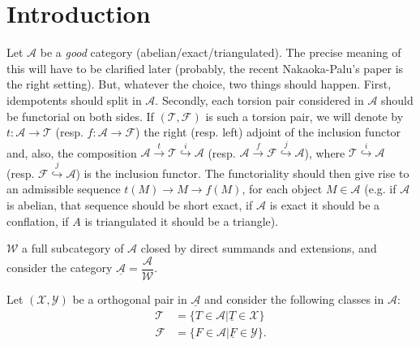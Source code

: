 \section{Introduction}

Let $\mathcal{A}$ be a \emph{good} category
(abelian/exact/triangulated). The precise meaning of this will have to
be clarified later (probably, the recent Nakaoka-Palu's paper is the
right setting). But, whatever the choice, two things should happen.
First, idempotents should split in $\mathcal{A}$. Secondly,  each
torsion pair considered  in $\mathcal{A}$ should be functorial on both
sides. If $(\mathcal{T},\mathcal{F})$ is such a torsion pair, we will
denote by $t:\mathcal{A}\longrightarrow\mathcal{T}$ (resp.
$f:\mathcal{A}\longrightarrow\mathcal{F}$) the right (resp. left)
adjoint of the inclusion functor and, also, the composition
$\mathcal{A}\stackrel{t}{\longrightarrow}\mathcal{T}\stackrel{i}{\hookrightarrow}\mathcal{A}$
(resp.
$\mathcal{A}\stackrel{f}{\longrightarrow}\mathcal{F}\stackrel{j}{\hookrightarrow}\mathcal{A}$),
where $\mathcal{T}\stackrel{i}{\hookrightarrow}\mathcal{A}$ (resp.
$\mathcal{F}\stackrel{j}{\hookrightarrow}\mathcal{A}$) is the inclusion
functor. The functoriality should then give rise to an admissible
sequence $t(M)\longrightarrow M\longrightarrow f(M)$, for each object
$M\in\mathcal{A}$ (e.g. if $\mathcal{A}$ is abelian, that sequence
should be short exact, if $\mathcal{A}$ is exact it should be a
conflation, if $A$ is triangulated it should be a triangle).



$\mathcal{W}$ a full subcategory of $\mathcal{A}$ closed by direct
summands and extensions, and consider the category
$\underline{\mathcal{A}}=\dfrac{\mathcal{A}}{\mathcal{W}}$.

Let $(\mathcal{X},\mathcal{Y})$ be a orthogonal pair in
$\underline{\mathcal{A}}$ and consider the following classes in
$\mathcal{A}$:
\begin{align*}
  \mathcal{T} &= \{ T\in\mathcal{A} | \underline{T}\in\mathcal{X} \} \\
  \mathcal{F} &= \{ F\in\mathcal{A} | \underline{F}\in\mathcal{Y} \}.
\end{align*}

\begin{lemma}
  [empty]
\end{lemma}

